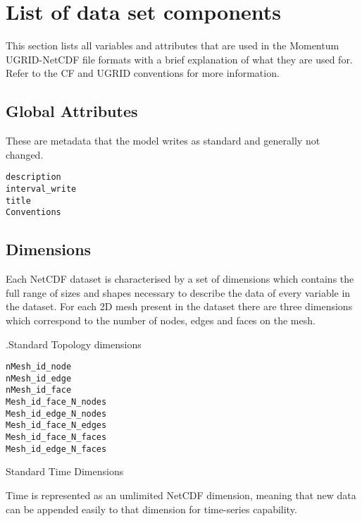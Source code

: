 \section{List of data set components}



This section lists all variables and attributes that are used in the Momentum UGRID-NetCDF file formats with a brief explanation of what they are used for. Refer to the CF and UGRID conventions for more information.

\subsection{Global Attributes}

These are metadata that the model writes as standard and generally not changed.


\begin{verbatim}
description
interval_write
title
Conventions
\end{verbatim}

\subsection{Dimensions}

Each NetCDF dataset is characterised by a set of dimensions which contains the full range of sizes and 
shapes necessary to describe the data of every variable in the dataset. For each 2D mesh present in the dataset there are three dimensions which correspond to the number of nodes, edges and faces on the mesh. 

.Standard Topology dimensions
\begin{verbatim}
nMesh_id_node
nMesh_id_edge
nMesh_id_face
Mesh_id_face_N_nodes
Mesh_id_edge_N_nodes
Mesh_id_face_N_edges
Mesh_id_face_N_faces
Mesh_id_edge_N_faces
\end{verbatim}

Standard Time Dimensions

Time is represented as an umlimited NetCDF dimension, meaning that new data can be appended easily to that dimension for time-series capability. 


